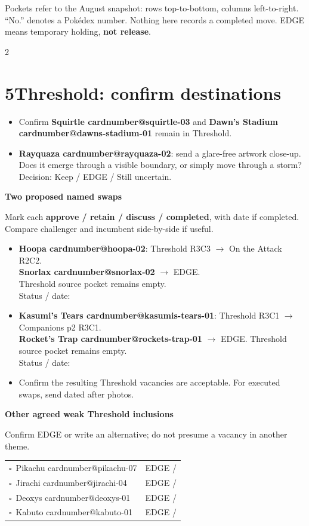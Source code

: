 \documentclass[10pt,a4paper]{article}
\makeatletter
\newcommand{\sub}[1]{\par\vspace{3pt}\textbf{#1}\par}
\newcommand{\id}[1]{\csname cardnumber@#1\endcsname}
\newcommand{\boxx}{$\square$}
\newcommand{\smallnote}[1]{{\fontsize{8.5}{10}\selectfont #1\par}}
\makeatother
\begin{document}
\smallnote{Pockets refer to the August snapshot: rows top-to-bottom, columns left-to-right. ``No.'' denotes a Pok\'edex number. Nothing here records a completed move. EDGE means temporary holding, \textbf{not release}.}
\begin{multicols}{2}
\section{5\quad Threshold: confirm destinations}
\begin{itemize}
\item Confirm \textbf{Squirtle \id{squirtle-03}} and \textbf{Dawn's Stadium \id{dawns-stadium-01}} remain in Threshold.
\item \textbf{Rayquaza \id{rayquaza-02}}: send a glare-free artwork close-up. Does it emerge through a visible boundary, or simply move through a storm?\\
Decision: Keep / EDGE / Still uncertain.
\end{itemize}

\sub{Two proposed named swaps}
Mark each \textbf{approve / retain / discuss / completed}, with date if completed. Compare challenger and incumbent side-by-side if useful.
\begin{itemize}
\item \textbf{Hoopa \id{hoopa-02}}: Threshold R3C3 $\rightarrow$ On the Attack R2C2.\\
\textbf{Snorlax \id{snorlax-02}} $\rightarrow$ EDGE.\\
Threshold source pocket remains empty.\\
Status / date: \hrulefill
\item \textbf{Kasumi's Tears \id{kasumis-tears-01}}: Threshold R3C1 $\rightarrow$ Companions p2 R3C1.\\
\textbf{Rocket's Trap \id{rockets-trap-01}} $\rightarrow$ EDGE. Threshold source pocket remains empty.\\
Status / date: \hrulefill
\item Confirm the resulting Threshold vacancies are acceptable. For executed swaps, send dated after photos.
\end{itemize}

\sub{Other agreed weak Threshold inclusions}
Confirm EDGE or write an alternative; do not presume a vacancy in another theme.\par
\begin{tabularx}{\linewidth}{@{}l X@{}}
\boxx\ Pikachu \id{pikachu-07} & EDGE / \hrulefill\\
\boxx\ Jirachi \id{jirachi-04} & EDGE / \hrulefill\\
\boxx\ Deoxys \id{deoxys-01} & EDGE / \hrulefill\\
\boxx\ Kabuto \id{kabuto-01} & EDGE / \hrulefill\\
\end{tabularx}


\end{multicols}
\end{document}

